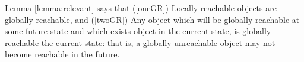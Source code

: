 Lemma  \ref{lemma:relevant} %
says that  (\ref{oneGR}) Locally reachable objects are globally reachable, and 
(\ref{twoGR}) Any object which will be globally reachable at some future state  and which exists object in the current state, is globally reachable the current state: that is, 
a globally unreachable object may not become reachable in the future.



